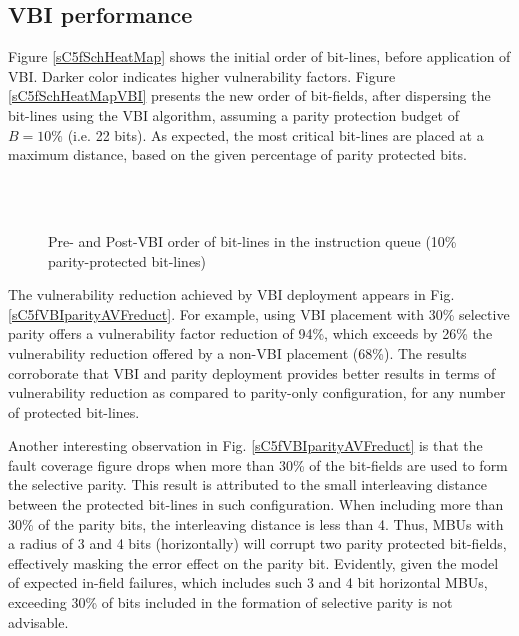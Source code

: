 \documentclass[12pt]{yalephd}
\begin{document}
\subsection{VBI performance}

Figure \ref{sC5fSchHeatMap} shows the initial order of bit-lines, before application of VBI. Darker color indicates higher vulnerability factors. Figure \ref{sC5fSchHeatMapVBI} presents the new order of bit-fields, after dispersing the bit-lines using the VBI algorithm, assuming a parity protection budget of $B=10\%$ (i.e. 22 bits). As expected, the most critical bit-lines are placed at a maximum distance, based on the given percentage of parity protected bits.

\begin{figure}[!ht]
    \centering
        \\
        \vspace{0.25in}
        \\
        \vspace{0.05in}
\caption{Pre- and Post-VBI order of bit-lines in the instruction queue (10\% parity-protected bit-lines)}
\label{sC5fVBISch}
\end{figure}

The vulnerability reduction achieved by VBI deployment appears in Fig. \ref{sC5fVBIparityAVFreduct}. For example, using VBI placement with 30\% selective parity offers a vulnerability factor reduction of 94\%, which exceeds by 26\% the vulnerability reduction offered by a non-VBI placement (68\%). The results corroborate that VBI and parity deployment provides better results in terms of vulnerability reduction as compared to parity-only configuration, for any number of protected bit-lines.

Another interesting observation in Fig. \ref{sC5fVBIparityAVFreduct} is that the fault coverage figure drops when more than 30\% of the bit-fields are used to form the selective parity. This result is attributed to the small interleaving distance between the protected bit-lines in such configuration. When including more than 30\% of the parity bits, the interleaving distance is less than 4. Thus, MBUs with a radius of 3 and 4 bits (horizontally) will corrupt two parity protected bit-fields, effectively masking the error effect on the parity bit. Evidently, given the model of expected in-field failures, which includes such 3 and 4 bit horizontal MBUs, exceeding 30\% of bits included in the formation of selective parity is not advisable.
\end{document}
